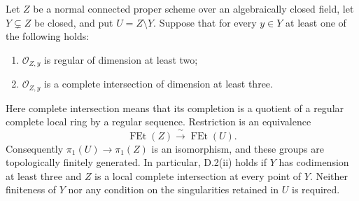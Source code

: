 \begin{proposition}
\label{D:local-purity-boundary}
Let $Z$ be a normal connected proper scheme over an algebraically
closed field, let $Y\subsetneq Z$ be closed, and put $U=Z\setminus Y$.
Suppose that for every $y\in Y$ at least one of the following holds:
\begin{enumerate}
\item $\mathcal O_{Z,y}$ is regular of dimension at least two;
\item $\mathcal O_{Z,y}$ is a complete intersection of dimension
at least three.
\end{enumerate}
Here complete intersection means that its completion is a quotient
of a regular complete local ring by a regular sequence.
Restriction is an equivalence
\[
                    \operatorname{FEt}(Z)
                 \xrightarrow{\ \sim\ }\operatorname{FEt}(U).
\]
Consequently $\pi_1(U)\to\pi_1(Z)$ is an isomorphism, and these
groups are topologically finitely generated.
In particular, D.2(ii) holds if $Y$ has codimension at least three
and $Z$ is a local complete intersection at every point of $Y$.
Neither finiteness of $Y$ nor any condition on the singularities
retained in $U$ is required.
\end{proposition}
